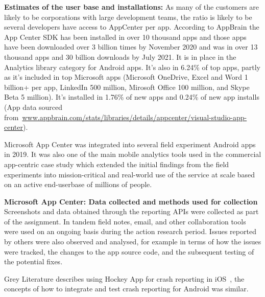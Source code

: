 \textbf{Estimates of the user base and installations:} As many of the customers are likely to be corporations with large development teams, the ratio is likely to be several developers have access to AppCenter per app. According to AppBrain the App Center SDK has been installed in over 10 thousand apps and those apps have been downloaded over 3 billion times by  November 2020 and was in over 13 thousand apps and 30 billion downloads by  July 2021. It is in  place in the Analytics library category for Android apps. It's also in 6.24\% of top apps, partly as it's included in top Microsoft apps (Microsoft OneDrive, Excel and Word 1 billion+ per app, LinkedIn 500 million, Mirosoft Office 100 million, and Skype Beta 5 million). It's installed in 1.76\% of new apps and 0.24\% of new app installs (App data sourced from~\href{https://www.appbrain.com/stats/libraries/details/appcenter/visual-studio-app-center}{www.appbrain.com/stats/libraries/details/appcenter/visual-studio-app-center}).

Microsoft App Center was integrated into several field experiment Android apps in 2019. It was also one of the main mobile analytics tools used in the commercial app-centric case study which extended the initial findings from the field experiments into mission-critical and real-world use of the service at scale based on an active end-userbase of millions of people.

\textbf{Microsoft App Center: Data collected and methods used for collection}
Screenshots and data obtained through the reporting APIs were collected as part of the assignment. In tandem field notes, email, and other collaboration tools were used on an ongoing basis during the action research period. Issues reported by others were also observed and analysed, for example in terms of how the issues were tracked, the changes to the app source code, and the subsequent testing of the potential fixes.

Grey Literature describes using Hockey App for crash reporting in iOS~, the concepts of how to integrate and test crash reporting for Android was similar.



